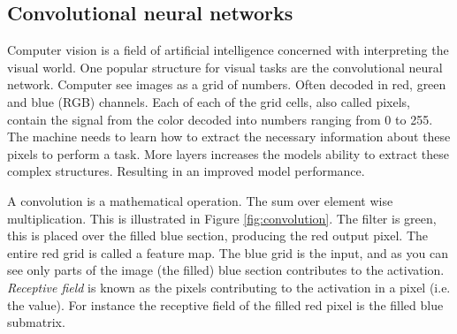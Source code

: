 \documentclass{article}
\begin{document}
\subsection{Convolutional neural networks} \label{sec:convolutional neural network}
Computer vision is a field of artificial intelligence concerned with interpreting the visual world. One popular structure for visual tasks are the convolutional neural network. %
Computer see images as a grid of numbers. Often decoded in red, green and blue (RGB) channels. Each of each of the grid cells, also called pixels, contain the signal from the color decoded into numbers ranging from 0 to 255. The machine needs to learn how to extract the necessary information about these pixels to perform a task. More layers increases the models ability to extract these complex structures. Resulting in an improved model performance. 

A convolution is a mathematical operation. The sum over element wise multiplication. This is illustrated in Figure \ref{fig:convolution}. The filter is green, this is placed over the filled blue section, producing the red output pixel. The entire red grid is called a feature map. The blue grid is the input, and as you can see only parts of the image (the filled) blue section contributes to the activation. \textit{Receptive field} is known as the pixels contributing to the activation in a pixel (i.e. the value). For instance the receptive field of the filled red pixel is the filled blue submatrix.

\end{document}
